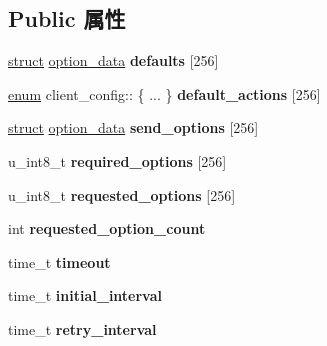 \subsection*{Public 属性}
\begin{DoxyCompactItemize}
\item 
\mbox{\label{structclient__config_ae47df6a566835980955251b219188aa4}} 
\hyperlink{interfacestruct}{struct} \hyperlink{structoption__data}{option\+\_\+data} {\bfseries defaults} \mbox{[}256\mbox{]}
\item 
\mbox{\label{structclient__config_ac2c74d8e9ae1d119feac623ebedb158f}} 
\hyperlink{interfaceenum}{enum} client\+\_\+config\+:: \{ ... \}  {\bfseries default\+\_\+actions} \mbox{[}256\mbox{]}
\item 
\mbox{\label{structclient__config_a9bb63b2dd0cbedd37509e636c1f0bbf0}} 
\hyperlink{interfacestruct}{struct} \hyperlink{structoption__data}{option\+\_\+data} {\bfseries send\+\_\+options} \mbox{[}256\mbox{]}
\item 
\mbox{\label{structclient__config_abec3a9f06316ad1d2025b830455ea843}} 
u\+\_\+int8\+\_\+t {\bfseries required\+\_\+options} \mbox{[}256\mbox{]}
\item 
\mbox{\label{structclient__config_a080a88832b8fa4c8683850fa95c48b75}} 
u\+\_\+int8\+\_\+t {\bfseries requested\+\_\+options} \mbox{[}256\mbox{]}
\item 
\mbox{\label{structclient__config_ad06bcb311e7968e4a3277f87f0fd17e2}} 
int {\bfseries requested\+\_\+option\+\_\+count}
\item 
\mbox{\label{structclient__config_a54823be657ddf74f35c7dc50c8a875cc}} 
time\+\_\+t {\bfseries timeout}
\item 
\mbox{\label{structclient__config_a92cafde5fbcab959605d7196e396d32e}} 
time\+\_\+t {\bfseries initial\+\_\+interval}
\item 
\mbox{\label{structclient__config_a47d977f6c9898f7c2b5748615815dbd9}} 
time\+\_\+t {\bfseries retry\+\_\+interval}

\end{DoxyCompactItemize}
